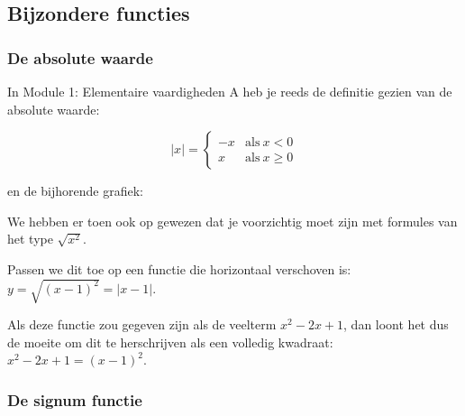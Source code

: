 


\subsection{Bijzondere functies}

\subsubsection{De absolute waarde}

In Module 1: Elementaire vaardigheden A heb je reeds de
definitie gezien van de absolute waarde:

\begin{equation*}
\left|x\right|=\begin{cases}
-x & \textrm{als}\:x<0\\
x & \textrm{als}\:x\geq0
\end{cases}
\end{equation*}

en de bijhorende grafiek:



We hebben er toen ook op gewezen dat je voorzichtig moet
zijn met formules van het type $\sqrt{x^{2}}$.

Passen we dit toe op een functie die horizontaal verschoven
is: $y=\sqrt{(x-1)^{2}}=\left|x-1\right|$.

Als deze functie zou gegeven zijn als de veelterm $x^{2}-2x+1$,
dan loont het dus de moeite om dit te herschrijven als een volledig
kwadraat: ${\displaystyle x^{2}-2x+1=\left(x-1\right)^{2}}$.


\subsubsection{De signum functie}

